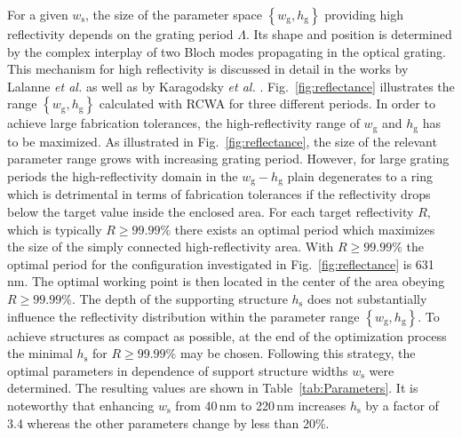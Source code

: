 \documentclass[twocolumn,secnumarabic,amssymb, nobibnotes, aps, prd, showpacs]{revtex4-1}
\begin{document}
\noindent For a given $w_\mathrm{s}$, the size of the parameter space $\left\{w_\mathrm{g}, h_\mathrm{g}\right\}$ providing high reflectivity depends on the grating period $\Lambda$. Its shape and position is determined by the complex interplay of two Bloch modes propagating in the optical grating. This mechanism for high reflectivity is discussed in detail in the works by Lalanne \textit{et al.} \cite{Lal2006} as well as by Karagodsky \textit{et al.} \cite{Kar2010}. Fig.~\ref{fig:reflectance} illustrates the range $\left\{w_\mathrm{g},h_\mathrm{g}\right\}$ calculated with RCWA for three different periods. In order to achieve large fabrication tolerances, the high-reflectivity range of $w_\mathrm{g}$ and $h_\mathrm{g}$ has to be maximized. As illustrated in Fig.~\ref{fig:reflectance}, the size of the relevant parameter range grows with increasing grating period. However, for large grating periods the high-reflectivity domain in the $w_\mathrm{g}-h_\mathrm{g}$ plain degenerates to a ring which is detrimental in terms of fabrication tolerances if the reflectivity drops below the target value inside the enclosed area. For each target reflectivity $R$, which is typically $R\geq99.99\%$ \cite{Kro2015} there exists an optimal period which maximizes the size of the simply connected high-reflectivity area. With $R\geq99.99\%$ the optimal period for the configuration investigated in Fig.~\ref{fig:reflectance} is 631\,nm. The optimal working point is then located in the center of the area obeying $R\geq99.99\%$. The depth of the supporting structure $h_\mathrm{s}$ does not substantially influence the reflectivity distribution within the parameter range $\left\{w_\mathrm{g}, h_\mathrm{g}\right\}$. To achieve structures as compact as possible, at the end of the optimization process the minimal $h_\mathrm{s}$ for $R\geq99.99\%$ may be chosen. Following this strategy, the optimal parameters in dependence of support structure widths $w_\mathrm{s}$ were determined. The resulting values are shown in Table~\ref{tab:Parameters}. It is noteworthy that enhancing $w_\mathrm{s}$ from 40\,nm to 220\,nm increases $h_\mathrm{s}$ by a factor of 3.4 whereas the other parameters change by less than 20\%.
\end{document}
